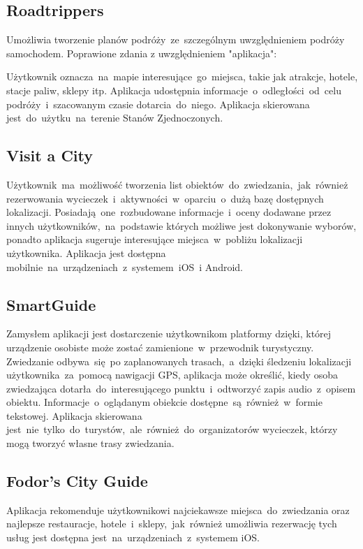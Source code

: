 \subsection{Roadtrippers}
\label{subsec:roadtrippers}
Umożliwia tworzenie planów podróży~ze~szczególnym uwzględnieniem podróży samochodem.
Poprawione zdania z uwzględnieniem "aplikacja":

Użytkownik oznacza~na~mapie interesujące~go~miejsca, takie jak atrakcje, hotele, stacje paliw, sklepy itp.
Aplikacja udostępnia informacje~o~odległości~od~celu podróży~i~szacowanym czasie dotarcia~do~niego.
Aplikacja skierowana jest~do~użytku~na~terenie Stanów Zjednoczonych.

\subsection{Visit a City}
\label{subsec:visit-a-city}
Użytkownik~ma~możliwość tworzenia list obiektów~do~zwiedzania,~jak~również rezerwowania wycieczek~i~aktywności~w~oparciu~o~dużą bazę dostępnych lokalizacji.
Posiadają~one~rozbudowane informacje~i~oceny dodawane przez innych użytkowników,~na~podstawie których możliwe jest dokonywanie wyborów, ponadto aplikacja sugeruje interesujące miejsca~w~pobliżu lokalizacji użytkownika.
Aplikacja jest dostępna mobilnie~na~urządzeniach~z~systemem~iOS~i Android.

\subsection{SmartGuide}
\label{subsec:smartguide}
Zamysłem aplikacji jest dostarczenie użytkownikom platformy dzięki, której urządzenie osobiste może zostać zamienione~w~przewodnik turystyczny.
Zwiedzanie odbywa~się~po zaplanowanych trasach,~a~dzięki śledzeniu lokalizacji użytkownika~za~pomocą nawigacji GPS, aplikacja może określić, kiedy osoba zwiedzająca dotarła~do~interesującego punktu~i~odtworzyć zapis audio~z~opisem obiektu.
Informacje~o~oglądanym obiekcie dostępne~są~również~w~formie tekstowej.
Aplikacja skierowana jest~nie~tylko~do~turystów,~ale~również~do~organizatorów wycieczek, którzy mogą tworzyć własne trasy zwiedzania.

\subsection{Fodor's City Guide}
\label{subsec:fodor's-city-guide}
Aplikacja rekomenduje użytkownikowi najciekawsze miejsca~do~zwiedzania oraz najlepsze restauracje, hotele~i~sklepy,~jak~również umożliwia rezerwację tych usług jest dostępna jest~na~urządzeniach~z~systemem iOS\@.

